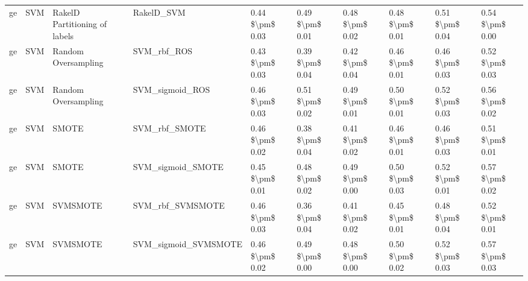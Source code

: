 \begin{tabular}{llllllllll}
      ge &                             SVM & RakelD Partitioning of labels &                                   RakelD\_SVM & 0.44 \$\textbackslash pm\$ 0.03 &           0.49 \$\textbackslash pm\$ 0.01 &       0.48 \$\textbackslash pm\$ 0.02 &        0.48 \$\textbackslash pm\$ 0.01 &                         0.51 \$\textbackslash pm\$ 0.04 &     0.54 \$\textbackslash pm\$ 0.00 \\
      ge &                             SVM &           Random Oversampling &                                  SVM\_rbf\_ROS & 0.43 \$\textbackslash pm\$ 0.03 &           0.39 \$\textbackslash pm\$ 0.04 &       0.42 \$\textbackslash pm\$ 0.04 &        0.46 \$\textbackslash pm\$ 0.01 &                         0.46 \$\textbackslash pm\$ 0.03 &     0.52 \$\textbackslash pm\$ 0.03 \\
      ge &                             SVM &           Random Oversampling &                              SVM\_sigmoid\_ROS & 0.46 \$\textbackslash pm\$ 0.03 &           0.51 \$\textbackslash pm\$ 0.02 &       0.49 \$\textbackslash pm\$ 0.01 &        0.50 \$\textbackslash pm\$ 0.01 &                         0.52 \$\textbackslash pm\$ 0.03 &     0.56 \$\textbackslash pm\$ 0.02 \\
      ge &                             SVM &                         SMOTE &                                SVM\_rbf\_SMOTE & 0.46 \$\textbackslash pm\$ 0.02 &           0.38 \$\textbackslash pm\$ 0.04 &       0.41 \$\textbackslash pm\$ 0.02 &        0.46 \$\textbackslash pm\$ 0.01 &                         0.46 \$\textbackslash pm\$ 0.03 &     0.51 \$\textbackslash pm\$ 0.01 \\
      ge &                             SVM &                         SMOTE &                            SVM\_sigmoid\_SMOTE & 0.45 \$\textbackslash pm\$ 0.01 &           0.48 \$\textbackslash pm\$ 0.02 &       0.49 \$\textbackslash pm\$ 0.00 &        0.50 \$\textbackslash pm\$ 0.03 &                         0.52 \$\textbackslash pm\$ 0.01 &     0.57 \$\textbackslash pm\$ 0.02 \\
      ge &                             SVM &                      SVMSMOTE &                             SVM\_rbf\_SVMSMOTE & 0.46 \$\textbackslash pm\$ 0.03 &           0.36 \$\textbackslash pm\$ 0.04 &       0.41 \$\textbackslash pm\$ 0.02 &        0.45 \$\textbackslash pm\$ 0.01 &                         0.48 \$\textbackslash pm\$ 0.04 &     0.52 \$\textbackslash pm\$ 0.01 \\
      ge &                             SVM &                      SVMSMOTE &                         SVM\_sigmoid\_SVMSMOTE & 0.46 \$\textbackslash pm\$ 0.02 &           0.49 \$\textbackslash pm\$ 0.00 &       0.48 \$\textbackslash pm\$ 0.00 &        0.50 \$\textbackslash pm\$ 0.02 &                         0.52 \$\textbackslash pm\$ 0.03 &     0.57 \$\textbackslash pm\$ 0.03 \\

\end{tabular}

